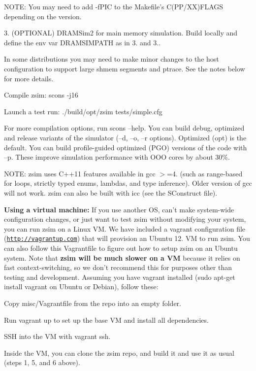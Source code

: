 \begin{DoxyEnumerate}
N\-O\-T\-E\-: You may need to add {\ttfamily -\/f\-P\-I\-C} to the Makefile's C(P\-P/\-X\-X)F\-L\-A\-G\-S depending on the version.

3. (O\-P\-T\-I\-O\-N\-A\-L) D\-R\-A\-M\-Sim2 for main memory simulation. Build locally and define the env var D\-R\-A\-M\-S\-I\-M\-P\-A\-T\-H as in 3. and 3..
\item In some distributions you may need to make minor changes to the host configuration to support large shmem segments and ptrace. See the notes below for more details.
\item Compile zsim\-: {\ttfamily scons -\/j16}
\item Launch a test run\-: {\ttfamily ./build/opt/zsim tests/simple.\-cfg}
\end{DoxyEnumerate}

For more compilation options, run scons --help. You can build debug, optimized and release variants of the simulator (--d, --o, --r options). Optimized (opt) is the default. You can build profile-\/guided optimized (P\-G\-O) versions of the code with --p. These improve simulation performance with O\-O\-O cores by about 30\%.

N\-O\-T\-E\-: zsim uses C++11 features available in {\ttfamily gcc $>$=4.} (such as range-\/based for loops, strictly typed enums, lambdas, and type inference). Older version of gcc will not work. zsim can also be built with {\ttfamily icc} (see the {\ttfamily S\-Construct} file).

{\bfseries Using a virtual machine\-:} If you use another O\-S, can't make system-\/wide configuration changes, or just want to test zsim without modifying your system, you can run zsim on a Linux V\-M. We have included a vagrant configuration file (\href{http://vagrantup.com}{\tt http\-://vagrantup.\-com}) that will provision an Ubuntu 12. V\-M to run zsim. You can also follow this Vagrantfile to figure out how to setup zsim on an Ubuntu system. Note that {\bfseries zsim will be much slower on a V\-M} because it relies on fast context-\/switching, so we don't recommend this for purposes other than testing and development. Assuming you have vagrant installed ({\ttfamily sudo apt-\/get install vagrant} on Ubuntu or Debian), follow these\-:


\begin{DoxyEnumerate}
\item Copy {\ttfamily misc/\-Vagrantfile} from the repo into an empty folder.
\item Run {\ttfamily vagrant up} to set up the base V\-M and install all dependencies.
\item S\-S\-H into the V\-M with {\ttfamily vagrant ssh}.
\item Inside the V\-M, you can clone the zsim repo, and build it and use it as usual (steps 1, 5, and 6 above).
\end{DoxyEnumerate}

